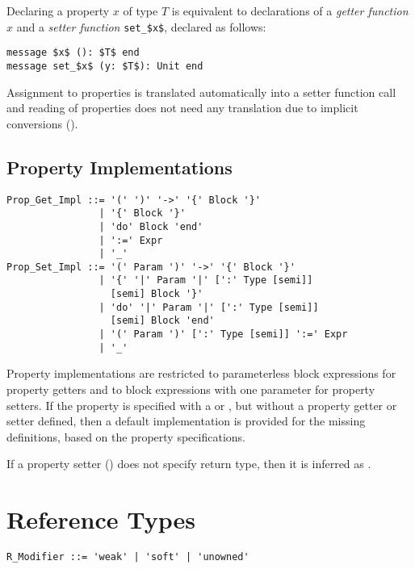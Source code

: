 Declaring a property $x$ of type $T$ is equivalent to declarations of a {\em getter function} $x$ and a {\em setter function} \lstinline!set_$x$!, declared as follows:

\begin{lstlisting}
message $x$ (): $T$ end
message set_$x$ (y: $T$): Unit end
\end{lstlisting}

Assignment to properties is translated automatically into a setter function call and reading of properties does not need any translation due to implicit conversions (). 






\subsection{Property Implementations}
\label{sec:property-impl}

\begin{lstlisting}
Prop_Get_Impl ::= '(' ')' '->' '{' Block '}'
                | '{' Block '}'
                | 'do' Block 'end'
                | ':=' Expr
                | '_'
Prop_Set_Impl ::= '(' Param ')' '->' '{' Block '}'
                | '{' '|' Param '|' [':' Type [semi]] 
                  [semi] Block '}'
                | 'do' '|' Param '|' [':' Type [semi]] 
                  [semi] Block 'end' 
                | '(' Param ')' [':' Type [semi]] ':=' Expr
                | '_'
\end{lstlisting}

Property implementations are restricted to parameterless block expressions for property getters and to block expressions with one parameter for property setters. If the property is specified with a  or , but without a property getter or setter defined, then a default implementation is provided for the missing definitions, based on the property specifications. 

If a property setter () does not specify return type, then it is inferred as . 





\section{Reference Types}
\label{sec:ref-types}

\syntax\begin{lstlisting}
R_Modifier ::= 'weak' | 'soft' | 'unowned'
\end{lstlisting}

